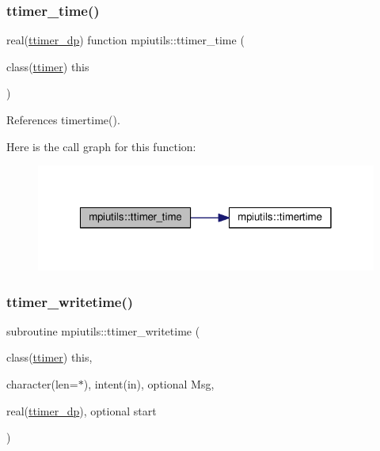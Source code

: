 \subsubsection{\texorpdfstring{ttimer\+\_\+time()}{ttimer\_time()}}
{\footnotesize\ttfamily real(\mbox{\hyperlink{namespacempiutils_a29264c4652e8287096a27ca2675edc26}{ttimer\+\_\+dp}}) function mpiutils\+::ttimer\+\_\+time (\begin{DoxyParamCaption}\item[{class(\mbox{\hyperlink{structmpiutils_1_1ttimer}{ttimer}})}]{this }\end{DoxyParamCaption})}



References timertime().

Here is the call graph for this function\+:
\nopagebreak
\begin{figure}[H]
\begin{center}
\leavevmode
\includegraphics[width=320pt]{namespacempiutils_a45301d4a23c7b66f94ef24ded2062d8d_cgraph}
\end{center}
\end{figure}
\mbox{\label{namespacempiutils_aec296fa19d748cab235ef01a63cdc289}} 
\subsubsection{\texorpdfstring{ttimer\+\_\+writetime()}{ttimer\_writetime()}}
{\footnotesize\ttfamily subroutine mpiutils\+::ttimer\+\_\+writetime (\begin{DoxyParamCaption}\item[{class(\mbox{\hyperlink{structmpiutils_1_1ttimer}{ttimer}})}]{this,  }\item[{character(len=$\ast$), intent(in), optional}]{Msg,  }\item[{real(\mbox{\hyperlink{namespacempiutils_a29264c4652e8287096a27ca2675edc26}{ttimer\+\_\+dp}}), optional}]{start }\end{DoxyParamCaption})}



